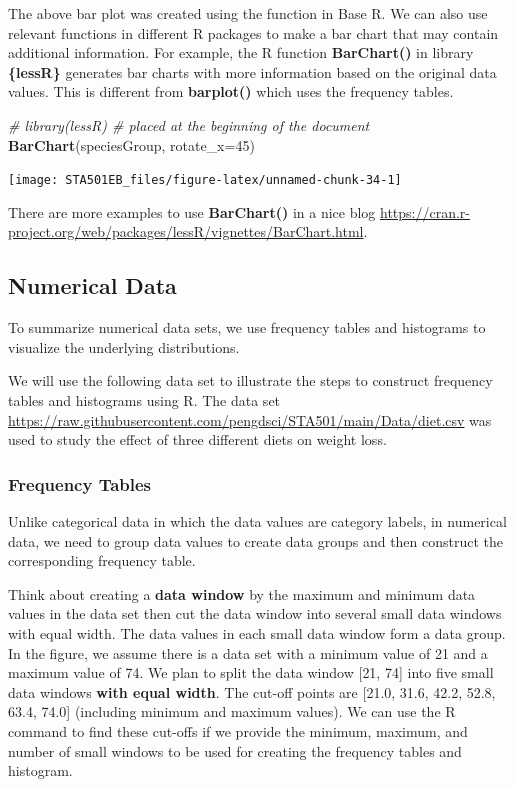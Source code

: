 \documentclass[
]{book}
\newenvironment{Shaded}{\begin{snugshade}}{\end{snugshade}}
\newcommand{\AttributeTok}[1]{\textcolor[rgb]{0.13,0.29,0.53}{#1}}
\newcommand{\CommentTok}[1]{\textcolor[rgb]{0.56,0.35,0.01}{\textit{#1}}}
\newcommand{\DecValTok}[1]{\textcolor[rgb]{0.00,0.00,0.81}{#1}}
\newcommand{\FunctionTok}[1]{\textcolor[rgb]{0.13,0.29,0.53}{\textbf{#1}}}
\newcommand{\NormalTok}[1]{#1}
\begin{document}
The above bar plot was created using the function in Base R. We can also use relevant functions in different R packages to make a bar chart that may contain additional information. For example, the R function \textbf{BarChart()} in library \textbf{\{lessR\}} generates bar charts with more information based on the original data values. This is different from \textbf{barplot()} which uses the frequency tables.

\begin{Shaded}
\begin{Highlighting}[]
\CommentTok{\# library(lessR)        \# placed at the beginning of the document}
\FunctionTok{BarChart}\NormalTok{(speciesGroup,  }\AttributeTok{rotate\_x=}\DecValTok{45}\NormalTok{)}
\end{Highlighting}
\end{Shaded}

\begin{center}\texttt{[image: STA501EB\_files/figure-latex/unnamed-chunk-34-1]} \end{center}

There are more examples to use \textbf{BarChart()} in a nice blog \url{https://cran.r-project.org/web/packages/lessR/vignettes/BarChart.html}.

\hypertarget{numerical-data}{%
\subsection{Numerical Data}\label{numerical-data}}

To summarize numerical data sets, we use frequency tables and histograms to visualize the underlying distributions.

We will use the following data set to illustrate the steps to construct frequency tables and histograms using R. The data set \url{https://raw.githubusercontent.com/pengdsci/STA501/main/Data/diet.csv} was used to study the effect of three different diets on weight loss.

\hypertarget{frequency-tables}{%
\subsubsection{Frequency Tables}\label{frequency-tables}}

Unlike categorical data in which the data values are category labels, in numerical data, we need to group data values to create data groups and then construct the corresponding frequency table.

Think about creating a \textbf{data window} by the maximum and minimum data values in the data set then cut the data window into several small data windows with equal width. The data values in each small data window form a data group. In the figure, we assume there is a data set with a minimum value of 21 and a maximum value of 74. We plan to split the data window {[}21, 74{]} into five small data windows \textbf{with equal width}. The cut-off points are {[}21.0, 31.6, 42.2, 52.8, 63.4, 74.0{]} (including minimum and maximum values). We can use the R command to find these cut-offs if we provide the minimum, maximum, and number of small windows to be used for creating the frequency tables and histogram.
\end{document}
